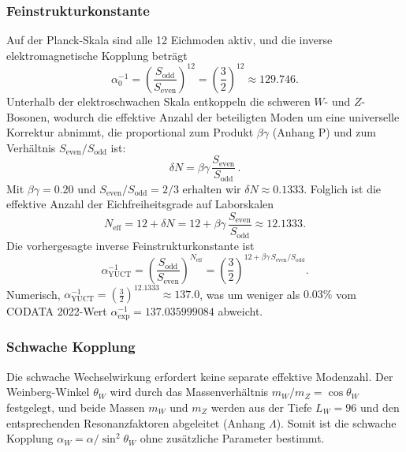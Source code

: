 \documentclass[12pt,a4paper]{article}
\begin{document}
	\subsubsection{Feinstrukturkonstante}
	
	Auf der Planck-Skala sind alle 12 Eichmoden aktiv, und die inverse elektromagnetische Kopplung beträgt
	\begin{equation}
		\alpha_0^{-1} = \left(\frac{S_{\mathrm{odd}}}{S_{\mathrm{even}}}\right)^{\!12}
		= \left(\frac{3}{2}\right)^{\!12} \approx 129.746 .
	\end{equation}
	Unterhalb der elektroschwachen Skala entkoppeln die schweren \(W\)- und \(Z\)-Bosonen, wodurch die effektive Anzahl der beteiligten Moden um eine universelle Korrektur abnimmt, die proportional zum Produkt \(\beta\gamma\) (Anhang P) und zum Verhältnis \(S_{\mathrm{even}}/S_{\mathrm{odd}}\) ist:
	\begin{equation}
		\delta N = \beta\gamma\,\frac{S_{\mathrm{even}}}{S_{\mathrm{odd}}}\, .
		\label{eq:deltaN2}
	\end{equation}
	Mit \(\beta\gamma = 0.20\) und \(S_{\mathrm{even}}/S_{\mathrm{odd}} = 2/3\) erhalten wir \(\delta N \approx 0.1333\). Folglich ist die effektive Anzahl der Eichfreiheitsgrade auf Laborskalen
	\begin{equation}
		N_{\mathrm{eff}} = 12 + \delta N = 12 + \beta\gamma\,\frac{S_{\mathrm{even}}}{S_{\mathrm{odd}}}
		\approx 12.1333 .
	\end{equation}
	Die vorhergesagte inverse Feinstrukturkonstante ist
	\begin{equation}
		\boxed{\alpha^{-1}_{\mathrm{YUCT}} =
			\left(\frac{S_{\mathrm{odd}}}{S_{\mathrm{even}}}\right)^{\!N_{\mathrm{eff}}}
			= \left(\frac{3}{2}\right)^{\!12 + \beta\gamma\,S_{\mathrm{even}}/S_{\mathrm{odd}}} } .
		\label{eq:alphaYUCT2}
	\end{equation}
	Numerisch, \(\alpha^{-1}_{\mathrm{YUCT}} = \left(\frac{3}{2}\right)^{\!12.1333} \approx 137.0\), was um weniger als \(0.03\%\) vom CODATA 2022-Wert \(\alpha^{-1}_{\mathrm{exp}} = 137.035999084\) abweicht.
	
	\subsubsection{Schwache Kopplung}
	Die schwache Wechselwirkung erfordert keine separate effektive Modenzahl. Der Weinberg-Winkel \(\theta_W\) wird durch das Massenverhältnis \(m_W/m_Z = \cos\theta_W\) festgelegt, und beide Massen \(m_W\) und \(m_Z\) werden aus der Tiefe \(L_W = 96\) und den entsprechenden Resonanzfaktoren abgeleitet (Anhang \(\Lambda\)). Somit ist die schwache Kopplung \(\alpha_W = \alpha/\sin^2\theta_W\) ohne zusätzliche Parameter bestimmt.
	
\end{document}
